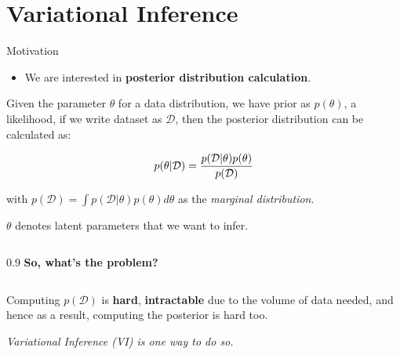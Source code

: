 \documentclass[aspectratio=169,xcolor=dvipsnames,svgnames,x11names,fleqn]{beamer}
\begin{document}
\section{Variational Inference}

\begin{frame}
    \sectionpage
\end{frame}



    

\begin{frame}{Motivation}

\footnotesize

    \begin{itemize}
        \item[] We are interested in \textbf{posterior distribution calculation}.
    \end{itemize}

    \begin{tcolorbox}[colback=white, colframe=MainBlue!10, title=\small Recall: Bayesian Framework, fonttitle=\bfseries, coltitle=MainBlue]
        Given the parameter $\theta$ for a data distribution, we have prior as $p(\theta)$, a likelihood, if we write dataset as $\mathcal{D}$, then the posterior distribution can be calculated as:
        
        \begin{equation*}
            \Large p(\theta | \mathcal{D}) = \frac{p(\mathcal{D} | \theta)p(\theta)}{p(\mathcal{D})}
        \end{equation*}
        
        with $p(\mathcal{D}) = \int p(\mathcal{D} |\theta)p(\theta)d\theta$ as the \textit{marginal distribution}.
    \end{tcolorbox}

$\theta$ denotes latent parameters that we want to infer.

    \begin{columns}
        \begin{column}{0.9\textwidth}
            \textbf{\color{AccentOrange}So, what's the problem?}
        \end{column}
    \end{columns}

    \pause
    
    \begin{tcolorbox}[enhanced, borderline west={2pt}{0pt}{red!70!black}, colback=red!5, frame hidden, sharp corners]
        Computing $p(\mathcal{D})$ is \textbf{hard}, \textbf{intractable} due to the volume of data needed, and hence as a result, computing the posterior is hard too.
    \end{tcolorbox}

\vspace{-10pt}
 
    \begin{center}
        \textit{Variational Inference (VI) is one way to do so.}
    \end{center}


\end{frame}
\end{document}
